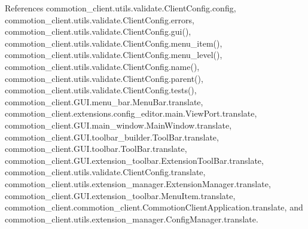 References commotion\+\_\+client.\+utils.\+validate.\+Client\+Config.\+config, commotion\+\_\+client.\+utils.\+validate.\+Client\+Config.\+errors, commotion\+\_\+client.\+utils.\+validate.\+Client\+Config.\+gui(), commotion\+\_\+client.\+utils.\+validate.\+Client\+Config.\+menu\+\_\+item(), commotion\+\_\+client.\+utils.\+validate.\+Client\+Config.\+menu\+\_\+level(), commotion\+\_\+client.\+utils.\+validate.\+Client\+Config.\+name(), commotion\+\_\+client.\+utils.\+validate.\+Client\+Config.\+parent(), commotion\+\_\+client.\+utils.\+validate.\+Client\+Config.\+tests(), commotion\+\_\+client.\+G\+U\+I.\+menu\+\_\+bar.\+Menu\+Bar.\+translate, commotion\+\_\+client.\+extensions.\+config\+\_\+editor.\+main.\+View\+Port.\+translate, commotion\+\_\+client.\+G\+U\+I.\+main\+\_\+window.\+Main\+Window.\+translate, commotion\+\_\+client.\+G\+U\+I.\+toolbar\+\_\+builder.\+Tool\+Bar.\+translate, commotion\+\_\+client.\+G\+U\+I.\+toolbar.\+Tool\+Bar.\+translate, commotion\+\_\+client.\+G\+U\+I.\+extension\+\_\+toolbar.\+Extension\+Tool\+Bar.\+translate, commotion\+\_\+client.\+utils.\+validate.\+Client\+Config.\+translate, commotion\+\_\+client.\+utils.\+extension\+\_\+manager.\+Extension\+Manager.\+translate, commotion\+\_\+client.\+G\+U\+I.\+extension\+\_\+toolbar.\+Menu\+Item.\+translate, commotion\+\_\+client.\+commotion\+\_\+client.\+Commotion\+Client\+Application.\+translate, and commotion\+\_\+client.\+utils.\+extension\+\_\+manager.\+Config\+Manager.\+translate.


